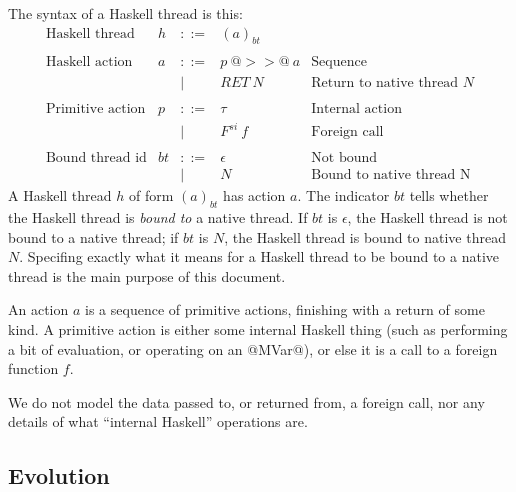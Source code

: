 \documentclass{article}
\newcommand{\fcall}[2]{F^{#1}~#2}
\newcommand{\ret}[1]{RET~#1}
\begin{document}
The syntax of a Haskell thread is this:
$$
\begin{array}{lrcll}
\mbox{Haskell thread} &  h & ::= & (a)_{bt} \\
\\
\mbox{Haskell action} &  a & ::= & p ~@>>@~ a  & \mbox{Sequence} \\
        & & | & \ret{N}  & \mbox{Return to native thread $N$} \\
\\
\mbox{Primitive action} &  p & ::= & \tau & \mbox{Internal action} \\
        & & | & \fcall{si}{f} & \mbox{Foreign call} \\
\\
\mbox{Bound thread id} & bt & ::= & \epsilon & \mbox{Not bound} \\
        & & | & N & \mbox{Bound to native thread N}
\end{array}
$$
A Haskell thread $h$ of form $(a)_{bt}$ has action $a$.  The indicator
$bt$ tells whether the Haskell thread is \emph{bound to} a native
thread.  If $bt$ is $\epsilon$, the Haskell thread is not bound to a
native thread; if $bt$ is $N$, the Haskell thread is bound to native
thread $N$.  Specifing exactly what it means for a Haskell thread to
be bound to a native thread is the main purpose of this document.

An action $a$ is a sequence of primitive actions, finishing with a 
return of some kind.  A primitive action is either some internal Haskell
thing (such as performing a bit of evaluation, or operating on an @MVar@),
or else it is a call to a foreign function $f$.

We do not model the data passed to, or returned from, a foreign call, nor
any details of what ``internal Haskell'' operations are.  

\subsection{Evolution}
\end{document}
